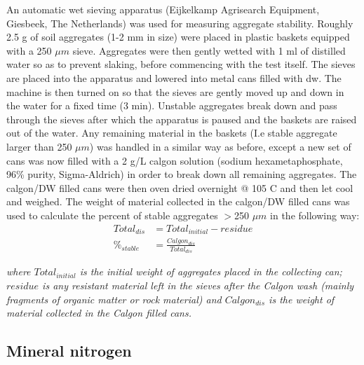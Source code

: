     	An automatic wet sieving apparatus (Eijkelkamp Agrisearch Equipment, Giesbeek, The Netherlands) was used for measuring aggregate stability. Roughly 2.5 g of soil aggregates (1-2 mm in size) were placed in plastic baskets equipped with a 250 $ \mu m $ sieve. Aggregates were then gently wetted with 1 ml of distilled water so as to prevent slaking, before commencing with the test itself. The sieves are  placed into the apparatus and lowered into metal cans filled with \gls{dw}. The machine is then turned on so that the sieves are gently moved up and down in the water for a fixed time (3 min). Unstable aggregates break down and pass through the sieves after which the apparatus is paused and the baskets are raised out of the water. Any remaining material in the baskets (I.e stable aggregate larger than 250 $ \mu m $) was handled in a similar way as before, except a new set of cans was now filled with a 2 g/L calgon solution (sodium hexametaphosphate, 96\% purity, Sigma-Aldrich) in order to break down all remaining aggregates. The calgon/DW filled cans were then oven dried overnight @ 105 C and  then let cool and weighed. The weight of material collected in the calgon/DW filled cans was used to calculate the percent of stable aggregates $ > $250 $ \mu m $ in the following way:\\

    	\begin{align}
    	Total_{dis} &= Total_{initial} - residue\\
    	\%_{stable} &= \frac{Calgon_{dis}}{Total_{dis}}
    	\end{align}

    	\begin{adjustwidth}{50pt}{50pt}
    		\begin{footnotesize}
    			\textit{where $ Total_{initial} $ is the initial weight of aggregates placed in the collecting can; $ residue $ is any resistant material left in the sieves after the Calgon wash (mainly fragments of organic matter  or rock material) and $ Calgon_{dis} $ is the weight of material collected in the Calgon filled cans.
    			}\\
    		\end{footnotesize}
    	\end{adjustwidth}

    \subsection{Mineral nitrogen}

